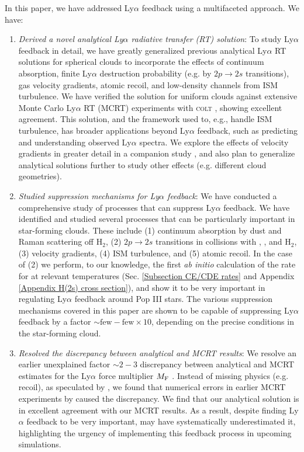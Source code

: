 \documentclass[fleqn,usenatbib]{mnras}
\newcommand\HI{\ion{H}{I}\xspace} %
\newcommand\HeI{\ion{He}{I}\xspace} %
\begin{document}
In this paper, we have addressed Ly$\alpha$ feedback using a multifaceted approach. We have:
\begin{enumerate}
    \item \textit{Derived a novel analytical Ly$\alpha$ radiative transfer (RT) solution}: To study Ly$\alpha$ feedback in detail, we have greatly generalized previous analytical Ly$\alpha$ RT solutions for spherical clouds to incorporate the effects of continuum absorption, finite Ly$\alpha$ destruction probability (e.g. by $2p \rightarrow 2s$ transitions), gas velocity gradients, atomic recoil, and low-density channels from ISM turbulence. We have verified the solution for uniform clouds against extensive Monte Carlo Ly$\alpha$ RT (MCRT) experiments with \textsc{colt} \citep{Smith2015}, showing excellent agreement. This solution, and the framework used to, e.g., handle ISM turbulence, has broader applications beyond Ly$\alpha$ feedback, such as predicting and understanding observed Ly$\alpha$ spectra. We explore the effects of velocity gradients in greater detail in a companion study \citep{Smith2025}, and also plan to generalize analytical solutions further to study other effects (e.g. different cloud geometries).
    \\
    
    \item \textit{Studied suppression mechanisms for Ly$\alpha$ feedback}: We have conducted a comprehensive study of processes that can suppress Ly$\alpha$ feedback. We have identified and studied several processes that can be particularly important in star-forming clouds. These include (1) continuum absorption by dust and Raman scattering off H$_2$, (2) $2p \rightarrow 2s$ transitions in collisions with \HI, \HeI, and H$_2$, (3) velocity gradients, (4) ISM turbulence, and (5) atomic recoil. In the case of (2) we perform, to our knowledge, the first \textit{ab initio} calculation of the rate for \HI at relevant temperatures (Sec. \ref{Subsection CE/CDE rates} and Appendix \ref{Appendix H(2s) cross section}), and show it to be very important in regulating Ly$\alpha$ feedback around Pop III stars. The various suppression mechanisms covered in this paper are shown to be capable of suppressing Ly$\alpha$ feedback by a factor $\sim \textrm{few} - \textrm{few} \times 10$, depending on the precise conditions in the star-forming cloud. 
    \\

    \item \textit{Resolved the discrepancy between analytical and MCRT results}: We resolve an earlier unexplained factor $\sim 2-3$ discrepancy between analytical and MCRT estimates for the Ly$\alpha$ force multiplier $M_{\rm F}$ \citep{Kimm2018, Lao2020, Tomaselli2021}. Instead of missing physics (e.g. recoil), as speculated by \cite{Tomaselli2021}, we found that numerical errors in earlier MCRT experiments by \cite{Kimm2018} caused the discrepancy. We find that our analytical solution is in excellent agreement with our MCRT results. As a result, despite finding Ly$\alpha$ feedback to be very important, \cite{Kimm2018} may have systematically underestimated it, highlighting the urgency of implementing this feedback process in upcoming simulations. \\
    

\end{enumerate}
\end{document}
